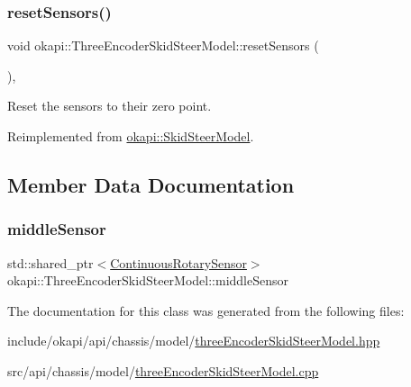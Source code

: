 \subsubsection{\texorpdfstring{resetSensors()}{resetSensors()}}
{\footnotesize\ttfamily void okapi\+::\+Three\+Encoder\+Skid\+Steer\+Model\+::reset\+Sensors (\begin{DoxyParamCaption}{ }\end{DoxyParamCaption})\hspace{0.3cm}{\ttfamily [override]}, {\ttfamily [virtual]}}

Reset the sensors to their zero point. 

Reimplemented from \mbox{\hyperlink{classokapi_1_1SkidSteerModel_af8885fc16e654eafa872dd7c760591cf}{okapi\+::\+Skid\+Steer\+Model}}.



\subsection{Member Data Documentation}
\mbox{\label{classokapi_1_1ThreeEncoderSkidSteerModel_a24ca08fb88096f1f3e5b84974086e972}} 
\subsubsection{\texorpdfstring{middleSensor}{middleSensor}}
{\footnotesize\ttfamily std\+::shared\+\_\+ptr$<$\mbox{\hyperlink{classokapi_1_1ContinuousRotarySensor}{Continuous\+Rotary\+Sensor}}$>$ okapi\+::\+Three\+Encoder\+Skid\+Steer\+Model\+::middle\+Sensor\hspace{0.3cm}{\ttfamily [protected]}}



The documentation for this class was generated from the following files\+:\begin{DoxyCompactItemize}
\item 
include/okapi/api/chassis/model/\mbox{\hyperlink{threeEncoderSkidSteerModel_8hpp}{three\+Encoder\+Skid\+Steer\+Model.\+hpp}}\item 
src/api/chassis/model/\mbox{\hyperlink{threeEncoderSkidSteerModel_8cpp}{three\+Encoder\+Skid\+Steer\+Model.\+cpp}}\end{DoxyCompactItemize}
